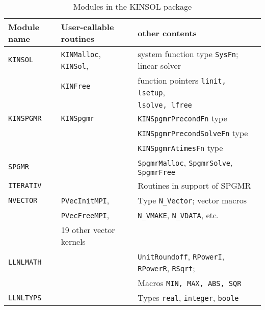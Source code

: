 \begin{table}[htb]
\begin{center}
\begin{tabular}{|l|l|l|} \hline
Module name & User-callable routines & other contents \\ \hline \hline
{\tt KINSOL} & {\tt KINMalloc}, {\tt KINSol}, & system function type {\tt SysFn};
 linear solver \\
            & {\tt KINFree}  & function pointers  {\tt linit, lsetup}, \\ 
            &       & {\tt lsolve, lfree} \\ \hline

{\tt KINSPGMR} &  {\tt KINSpgmr} &  {\tt KINSpgmrPrecondFn} type \\
         &           &  {\tt KINSpgmrPrecondSolveFn} type \\
         &           &  {\tt KINSpgmrAtimesFn} type \\ \hline
{\tt SPGMR}    & & {\tt SpgmrMalloc}, {\tt SpgmrSolve}, {\tt SpgmrFree} \\ \hline
{\tt ITERATIV} & & Routines in support of SPGMR \\ \hline
{\tt NVECTOR}  & {\tt PVecInitMPI},             & Type {\tt N\_Vector}; vector 
macros \\
         & {\tt PVecFreeMPI},            & {\tt N\_VMAKE}, {\tt N\_VDATA}, etc. \\
         & 19 other vector kernels  & \\ \hline
{\tt LLNLMATH} & & {\tt UnitRoundoff}, {\tt RPowerI}, {\tt RPowerR}, {\tt RSqrt}; \\
         & & Macros {\tt MIN, MAX, ABS, SQR} \\ \hline
{\tt LLNLTYPS} & & Types {\tt real}, {\tt integer}, {\tt boole} \\ \hline
\end{tabular}
\vspace{0.1 in}
\caption{Modules in the KINSOL package}
\label{KINmodules}
\end{center}
\end{table}

